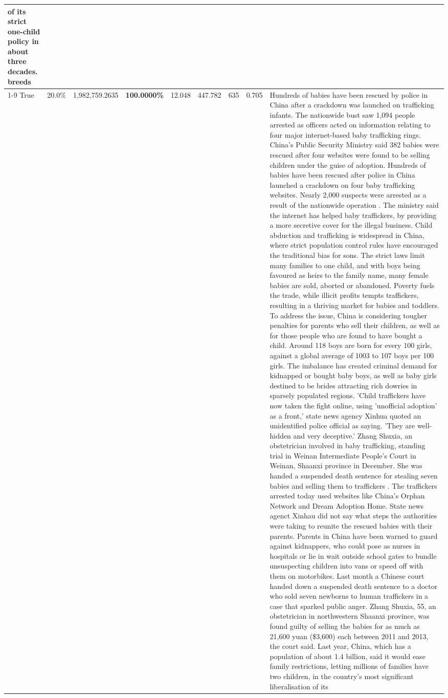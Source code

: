 \begin{table}[H]
\begin{tabular}{lllrlllll}
of its strict one-child policy in about three decades. breeds \\
\cline{1-9}
True & 20.0\% & 1,982,759.2635 & \bfseries \color{red} 100.0000\% & 12.048 & 447.782 & 635 & 0.705 & Hundreds of babies have been rescued by police in China after a crackdown was launched on trafficking infants. The nationwide bust saw 1,094 people arrested as officers acted on information relating to four major internet-based baby trafficking rings. China's Public Security Ministry said 382 babies were rescued after four websites were found to be selling children under the guise of adoption. Hundreds of babies have been rescued after police in China launched a crackdown on four baby trafficking websites. Nearly 2,000 suspects were arrested as a result of the nationwide operation . The ministry said the internet has helped baby traffickers, by providing a more secretive cover for the illegal business. Child abduction and trafficking is widespread in China, where strict population control rules have encouraged the traditional bias for sons. The strict laws limit many families to one child, and with boys being favoured as heirs to the family name, many female babies are sold, aborted or abandoned. Poverty fuels the trade, while illicit profits tempts traffickers, resulting in a thriving market for babies and toddlers. To address the issue, China is considering tougher penalties for parents who sell their children, as well as for those people who are found to have bought a child. Around 118 boys are born for every 100 girls, against a global average of 1003 to 107 boys per 100 girls. The imbalance has created criminal demand for kidnapped or bought baby boys, as well as baby girls destined to be brides attracting rich dowries in sparsely populated regions. 'Child traffickers have now taken the fight online, using 'unofficial adoption' as a front,' state news agency Xinhua quoted an unidentified police official as saying. 'They are well-hidden and very deceptive.' Zhang Shuxia, an obstetrician involved in baby trafficking, standing trial in Weinan Intermediate People's Court in Weinan, Shaanxi province in December. She was handed a suspended death sentence for stealing seven babies and selling them to traffickers . The traffickers arrested today used websites like China's Orphan Network and Dream Adoption Home. State news agenct Xinhau did not say what steps the authorities were taking to reunite the rescued babies with their parents. Parents in China have been warned to guard against kidnappers, who could pose as nurses in hospitals or lie in wait outside school gates to bundle unsuspecting children into vans or speed off with them on motorbikes. Last month a Chinese court handed down a suspended death sentence to a doctor who sold seven newborns to human traffickers in a case that sparked public anger. Zhang Shuxia, 55, an obstetrician in northwestern Shaanxi province, was found guilty of selling the babies for as much as 21,600 yuan (\$3,600) each between 2011 and 2013, the court said. Last year, China, which has a population of about 1.4 billion, said it would ease family restrictions, letting millions of families have two children, in the country's most significant liberalisation of its 
\end{tabular}
\end{table}
